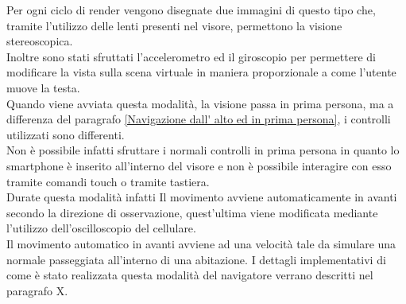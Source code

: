 Per ogni ciclo di render vengono disegnate due immagini di questo tipo che, tramite l’utilizzo delle lenti presenti nel visore, permettono la visione stereoscopica.
\\
Inoltre sono stati sfruttati l’accelerometro ed il giroscopio per permettere di modificare la vista sulla scena virtuale in maniera proporzionale a come l’utente muove la testa.
\\
Quando viene avviata questa modalità, la visione passa in prima persona, ma a differenza del paragrafo \ref{Navigazione dall' alto ed in prima persona}, i controlli utilizzati sono differenti.
\\
Non è possibile infatti sfruttare i normali controlli in prima persona in quanto lo smartphone è inserito all’interno del visore e non è possibile interagire con esso tramite comandi touch o tramite tastiera.
\\
Durate questa modalità infatti Il movimento avviene automaticamente in avanti secondo la direzione di osservazione, quest’ultima viene modificata mediante l’utilizzo dell’oscilloscopio del cellulare.
\\
Il movimento automatico in avanti avviene ad una velocità tale da simulare una normale passeggiata all’interno di una abitazione.
I dettagli implementativi di come è stato realizzata questa modalità del navigatore verrano descritti nel paragrafo X.

